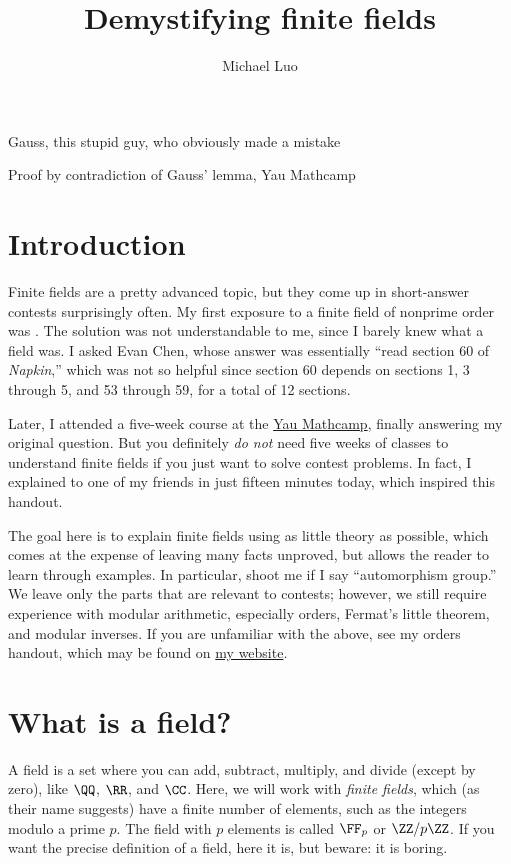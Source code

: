\documentclass[11pt]{scrartcl}
\title{Demystifying finite fields}
\author{Michael Luo}
\begin{document}
\maketitle

\epigraph{Gauss, this stupid guy, who obviously made a mistake}{Proof by contradiction of Gauss' lemma, Yau Mathcamp}

\tableofcontents
\eject

\section*{Introduction}

Finite fields are a pretty advanced topic, but they come up in short-answer contests surprisingly often. My first exposure to a finite field of nonprime order was . The solution was not understandable to me, since I barely knew what a field was. I asked Evan Chen, whose answer was essentially ``read section 60 of \emph{Napkin},'' which was not so helpful since section 60 depends on sections 1, 3 through 5, and 53 through 59, for a total of 12 sections.

Later, I attended a five-week course at the \href{https://mathcamp.simis.cn/2024/}{Yau Mathcamp}, finally answering my original question. But you definitely \emph{do not} need five weeks of classes to understand finite fields if you just want to solve contest problems. In fact, I explained  to one of my friends in just fifteen minutes today, which inspired this handout.

The goal here is to explain finite fields using as little theory as possible, which comes at the expense of leaving many facts unproved, but allows the reader to learn through examples. In particular, shoot me if I say ``automorphism group.'' We leave only the parts that are relevant to contests; however, we still require experience with modular arithmetic, especially orders, Fermat's little theorem, and modular inverses. If you are unfamiliar with the above, see my orders handout, which may be found on \href{https://knowingant.github.io/handouts/orders/orders.pdf}{my website}.

\section{What is a field?}

A field is a set where you can add, subtract, multiply, and divide (except by zero), like $\QQ$, $\RR$, and $\CC$. Here, we will work with \emph{finite fields}, which (as their name suggests) have a finite number of elements, such as the integers modulo a prime $p$. The field with $p$ elements is called $\FF_p$ or $\ZZ/p\ZZ$. If you want the precise definition of a field, here it is, but beware: it is boring.
\end{document}
